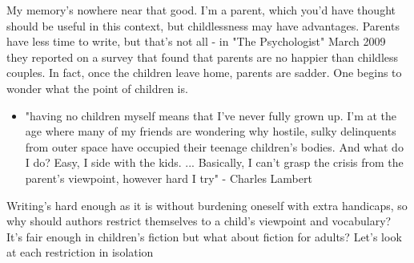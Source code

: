 \documentclass[11pt]{article}
\begin{document}
My memory's nowhere near that good. I'm a parent, which you'd have thought should be useful in this context, but childlessness may have advantages. Parents have less time to write, but that's not all - in "The Psychologist" March 2009 they reported on a survey that found that parents are no happier than childless couples. In fact, once the children leave home, parents are sadder. One begins to wonder what the point of children is.



\begin{itemize}
\item "having no children myself means that I've never fully grown up. I'm at the age where many of my friends are wondering why hostile, sulky delinquents from outer space have occupied their teenage children's bodies. And what do I do? Easy, I side with the kids. ... Basically, I can't grasp the crisis from the parent's viewpoint, however hard I try" - Charles Lambert
\end{itemize}

Writing's hard enough as it is without burdening oneself with extra handicaps, so why should authors restrict themselves to a child's viewpoint and vocabulary? It's fair enough in children's fiction but what about fiction for adults? Let's look at each restriction in isolation
\end{document}
